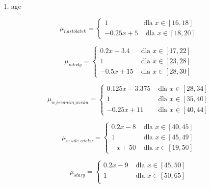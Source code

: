\documentclass{classrep}
\begin{document}
\begin{enumerate}
  \item age

      \begin{equation}
        \mu_{nastolatek} =
          \begin{cases}
            1 & \text{dla } x \in [16,18] \\
            -0.25x +5 & \text{ dla } x \in [18,20]
          \end{cases}  
      \end{equation}

      \begin{equation}
        \mu_{młody} =
        \begin{cases}
            0.2x-3.4 & \text{ dla } x \in [17,22]  \\
            1 & \text{ dla } x \in [23,28] \\
            -0.5x + 15 & \text{ dla } x \in [28,30]
          \end{cases}
      \end{equation}

      \begin{equation}
        \mu_{w\_średnim\_wieku} =
                \begin{cases}
            0.125x-3.375 & \text{ dla } x \in [28,34]  \\
            1 & \text{ dla } x \in [35,40] \\
            -0.25x + 11 & \text{ dla } x \in [40,44]
          \end{cases}
      \end{equation} 

      \begin{equation}
        \mu_{w\_sile\_ wieku} =
        \begin{cases}
            0.2x-8 & \text{ dla } x \in [40,45]  \\
            1 & \text{ dla } x \in [45,49] \\
            -x + 50 & \text{ dla } x \in [19,50]
          \end{cases}
      \end{equation} 

      \begin{equation}
        \mu_{stary} =
        \begin{cases}
            0.2x-9 & \text{ dla } x \in [45,50]  \\
            1 & \text{ dla } x \in [50,65] \\
          \end{cases}
      \end{equation} 


\end{enumerate}
\end{document}
